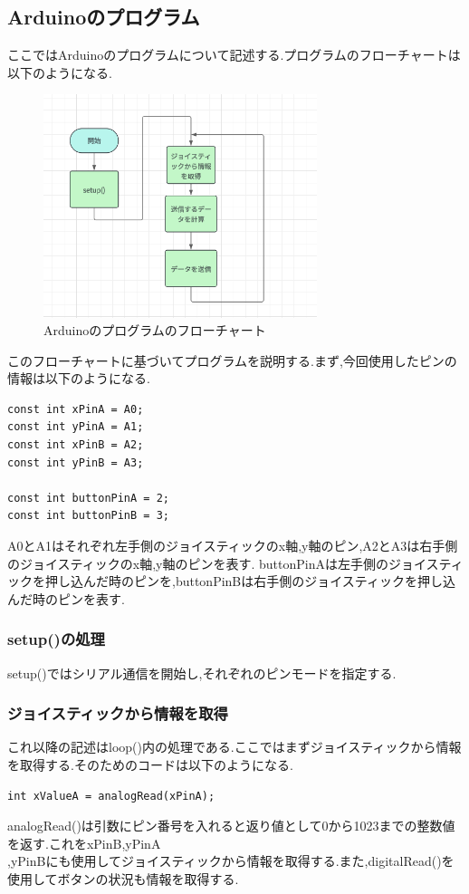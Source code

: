 \documentclass[dvipdfmx]{jarticle}
\begin{document}
\subsection{Arduinoのプログラム}
ここではArduinoのプログラムについて記述する.プログラムのフローチャートは以下のようになる.\cite{2}
\begin{figure}[h]
    \centering
    \includegraphics[width=8cm]{arduino_huroty.png}
    \caption{Arduinoのプログラムのフローチャート}
\end{figure}
このフローチャートに基づいてプログラムを説明する.まず,今回使用したピンの情報は以下のようになる.
\begin{lstlisting}
const int xPinA = A0;
const int yPinA = A1;
const int xPinB = A2;
const int yPinB = A3;

const int buttonPinA = 2;
const int buttonPinB = 3;
\end{lstlisting}
A0とA1はそれぞれ左手側のジョイスティックのx軸,y軸のピン,A2とA3は右手側のジョイスティックのx軸,y軸のピンを表す.
buttonPinAは左手側のジョイスティックを押し込んだ時のピンを,buttonPinBは右手側のジョイスティックを押し込んだ時のピンを表す.
\subsubsection{setup()の処理}
setup()ではシリアル通信を開始し,それぞれのピンモードを指定する.
\subsubsection{ジョイスティックから情報を取得}
これ以降の記述はloop()内の処理である.ここではまずジョイスティックから情報を取得する.そのためのコードは以下のようになる.
\begin{lstlisting}
int xValueA = analogRead(xPinA);
\end{lstlisting}
analogRead()は引数にピン番号を入れると返り値として0から1023までの整数値を返す.これをxPinB,yPinA\\
,yPinBにも使用してジョイスティックから情報を取得する.また,digitalRead()を使用してボタンの状況も情報を取得する.
\end{document}
